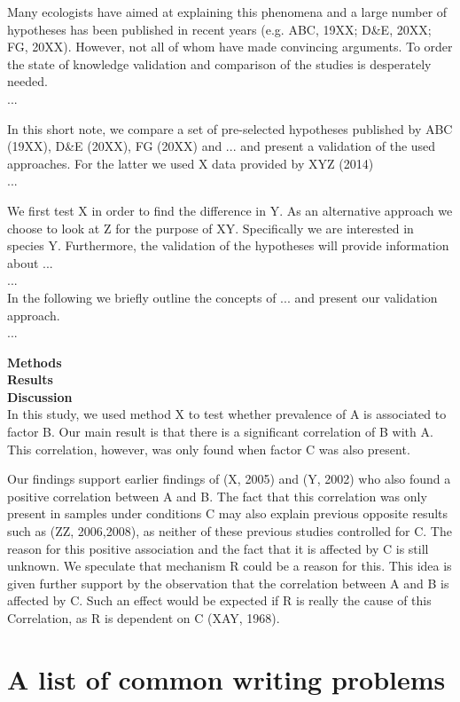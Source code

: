 \documentclass{tufte-book}
\begin{document}
Many ecologists have aimed at explaining this phenomena and a large number of hypotheses has been published in recent years (e.g. ABC, 19XX; D\&E, 20XX; FG, 20XX). However, not all of whom have made convincing arguments. To order the state of knowledge validation and comparison of the studies is desperately needed.\\
...

In this short note, we compare a set of pre-selected hypotheses published by ABC (19XX), D\&E (20XX), FG (20XX) and ... and present a validation of the used approaches. For the latter we used X data provided by XYZ (2014)\\
... 

We first test X in order to find the difference in Y. As an alternative approach we choose to look at Z for the purpose of XY. Specifically we are interested in species Y. Furthermore, the validation of the hypotheses will provide information about ...\\
...\\
In the following we briefly outline the concepts of ... and present our validation approach.\\
...

\noindent\textbf{Methods}\\

\noindent\textbf{Results}\\

\noindent\textbf{Discussion}\\
In this study, we used method X to test whether prevalence of A
is associated to factor B. Our main result is that there is a
significant correlation of B with A. This correlation, however, was
only found when factor C was also present.

Our findings support earlier findings of (X, 2005) and (Y, 2002)
who also found a positive correlation between A and B. The fact
that this correlation was only present in samples under conditions
C may also explain previous opposite results such as (ZZ,
2006,2008), as neither of these previous studies controlled for C.
The reason for this positive association and the fact that it is
affected by C is still unknown. We speculate that mechanism R
could be a reason for this. This idea is given further support by
the observation that the correlation between A and B is affected
by C. Such an effect would be expected if R is really the cause of
this Correlation, as R is dependent on C (XAY, 1968).



\section{A list of common writing problems}
\end{document}
